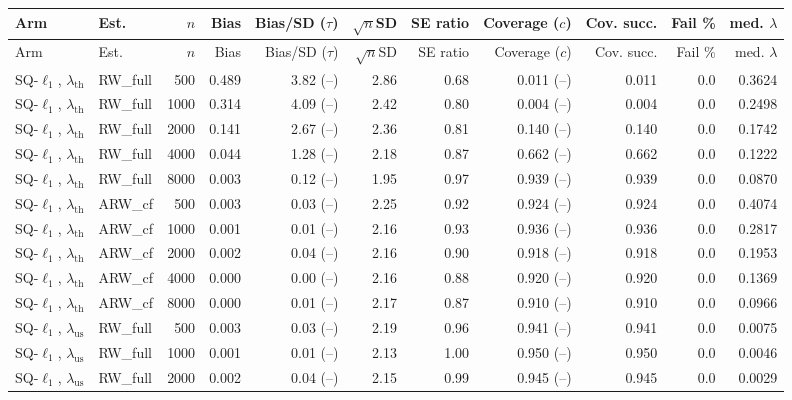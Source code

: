 \begin{tabular}{llrrrrrrrrr}
\hline
Arm & Est. & $n$ & Bias & Bias/SD ($\tau$) & $\sqrt n$SD & SE ratio & Coverage ($c$) & Cov. succ. & Fail \% & med. $\lambda$ \\
\hline
\endfirsthead
\hline
Arm & Est. & $n$ & Bias & Bias/SD ($\tau$) & $\sqrt n$SD & SE ratio & Coverage ($c$) & Cov. succ. & Fail \% & med. $\lambda$ \\
\hline
\endhead
SQ-$\ell_1$, $\lambda_{\mathrm{th}}$ & RW\_full & 500 & 0.489 & 3.82 (--) & 2.86 & 0.68 & 0.011 (--) & 0.011 & 0.0 & 0.3624 \\
SQ-$\ell_1$, $\lambda_{\mathrm{th}}$ & RW\_full & 1000 & 0.314 & 4.09 (--) & 2.42 & 0.80 & 0.004 (--) & 0.004 & 0.0 & 0.2498 \\
SQ-$\ell_1$, $\lambda_{\mathrm{th}}$ & RW\_full & 2000 & 0.141 & 2.67 (--) & 2.36 & 0.81 & 0.140 (--) & 0.140 & 0.0 & 0.1742 \\
SQ-$\ell_1$, $\lambda_{\mathrm{th}}$ & RW\_full & 4000 & 0.044 & 1.28 (--) & 2.18 & 0.87 & 0.662 (--) & 0.662 & 0.0 & 0.1222 \\
SQ-$\ell_1$, $\lambda_{\mathrm{th}}$ & RW\_full & 8000 & 0.003 & 0.12 (--) & 1.95 & 0.97 & 0.939 (--) & 0.939 & 0.0 & 0.0870 \\
SQ-$\ell_1$, $\lambda_{\mathrm{th}}$ & ARW\_cf & 500 & 0.003 & 0.03 (--) & 2.25 & 0.92 & 0.924 (--) & 0.924 & 0.0 & 0.4074 \\
SQ-$\ell_1$, $\lambda_{\mathrm{th}}$ & ARW\_cf & 1000 & 0.001 & 0.01 (--) & 2.16 & 0.93 & 0.936 (--) & 0.936 & 0.0 & 0.2817 \\
SQ-$\ell_1$, $\lambda_{\mathrm{th}}$ & ARW\_cf & 2000 & 0.002 & 0.04 (--) & 2.16 & 0.90 & 0.918 (--) & 0.918 & 0.0 & 0.1953 \\
SQ-$\ell_1$, $\lambda_{\mathrm{th}}$ & ARW\_cf & 4000 & 0.000 & 0.00 (--) & 2.16 & 0.88 & 0.920 (--) & 0.920 & 0.0 & 0.1369 \\
SQ-$\ell_1$, $\lambda_{\mathrm{th}}$ & ARW\_cf & 8000 & 0.000 & 0.01 (--) & 2.17 & 0.87 & 0.910 (--) & 0.910 & 0.0 & 0.0966 \\
SQ-$\ell_1$, $\lambda_{\mathrm{us}}$ & RW\_full & 500 & 0.003 & 0.03 (--) & 2.19 & 0.96 & 0.941 (--) & 0.941 & 0.0 & 0.0075 \\
SQ-$\ell_1$, $\lambda_{\mathrm{us}}$ & RW\_full & 1000 & 0.001 & 0.01 (--) & 2.13 & 1.00 & 0.950 (--) & 0.950 & 0.0 & 0.0046 \\
SQ-$\ell_1$, $\lambda_{\mathrm{us}}$ & RW\_full & 2000 & 0.002 & 0.04 (--) & 2.15 & 0.99 & 0.945 (--) & 0.945 & 0.0 & 0.0029 \\

\end{tabular}
